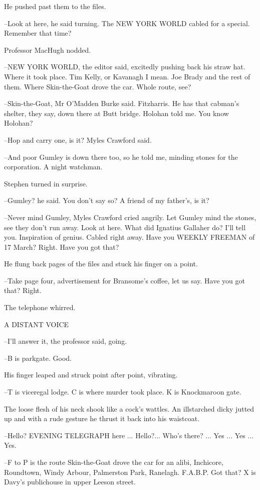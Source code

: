 He pushed past them to the files.

--Look at here, he said turning. The NEW YORK WORLD cabled for a special.
Remember that time?

Professor MacHugh nodded.

--NEW YORK WORLD, the editor said, excitedly pushing back his straw hat.
Where it took place. Tim Kelly, or Kavanagh I mean. Joe Brady and the
rest of them. Where Skin-the-Goat drove the car. Whole route, see?

--Skin-the-Goat, Mr O'Madden Burke said. Fitzharris. He has that
cabman's shelter, they say, down there at Butt bridge. Holohan told me.
You know Holohan?

--Hop and carry one, is it? Myles Crawford said.

--And poor Gumley is down there too, so he told me, minding stones for
the corporation. A night watchman.

Stephen turned in surprise.

--Gumley? he said. You don't say so? A friend of my father's, is it?

--Never mind Gumley, Myles Crawford cried angrily. Let Gumley mind
the stones, see they don't run away. Look at here. What did Ignatius
Gallaher do? I'll tell you. Inspiration of genius. Cabled right away. Have
you WEEKLY FREEMAN of 17 March? Right. Have you got that?

He flung back pages of the files and stuck his finger on a point.

--Take page four, advertisement for Bransome's coffee, let us say. Have
you got that? Right.

The telephone whirred.


    A DISTANT VOICE


--I'll answer it, the professor said, going.

--B is parkgate. Good.

His finger leaped and struck point after point, vibrating.

--T is viceregal lodge. C is where murder took place. K is Knockmaroon
gate.

The loose flesh of his neck shook like a cock's wattles. An illstarched
dicky jutted up and with a rude gesture he thrust it back into his
waistcoat.

--Hello? EVENING TELEGRAPH here ... Hello?... Who's there? ...
Yes ... Yes ... Yes.

--F to P is the route Skin-the-Goat drove the car for an alibi, Inchicore,
Roundtown, Windy Arbour, Palmerston Park, Ranelagh. F.A.B.P. Got that?
X is Davy's publichouse in upper Leeson street.

